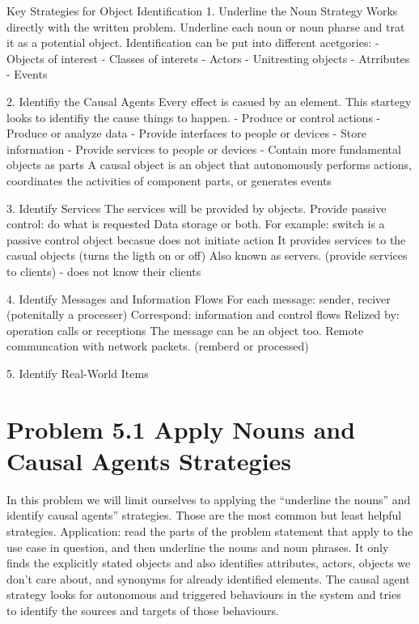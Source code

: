 \documentclass[12pt,a4paper]{article}
\begin{document}
Key Strategies for Object Identification
1. Underline the Noun Strategy
Works directly with the written problem.
Underline each noun or noun pharse and trat it as a potential object.
Identification can be put into different acetgories:
- Objects of interest
- Classes of interets
- Actors
- Unitresting objects
- Atrributes
- Events

2. Identifiy the Causal Agents
Every effect is casued by an element. 
This startegy looks to identifiy the cause things to happen.
- Produce or control actions
- Produce or analyze data
- Provide interfaces to people or devices
- Store information
- Provide services to people or devices
- Contain more fundamental objects as parts
A causal object is an object that autonomously performs actions, coordinates the activities of component parts, 
or generates events

3. Identify Services
The services will be provided by objects.
Provide passive control: do what is requested
Data storage or both.
For example: switch is a passive control object becasue does not initiate action
It provides services to the casual objects (turns the ligth on or off)
Also known as servers. (provide services to clients) - does not know their clients

4. Identify Messages and Information Flows
For each message: sender, reciver (potenitally a processer)
Correspond: information and control flows
Relized by: operation calls or receptions
The message can be an object too. Remote communcation with network packets. (remberd or processed)

5. Identify Real-World Items

\section{Problem 5.1 Apply Nouns and Causal Agents Strategies}
In this problem we will limit ourselves to applying the “underline the nouns” and identify causal agents” strategies. Those are the most common but least helpful strategies. Application: read the parts of the problem statement that apply to the use case in question, and then underline the nouns and noun phrases. It only finds the explicitly stated objects and also identifies attributes, actors,
objects we don’t care about, and synonyms for already identified elements. The causal agent strategy looks for autonomous and triggered behaviours in the
system and tries to identify the sources and targets of those behaviours.
\end{document}
